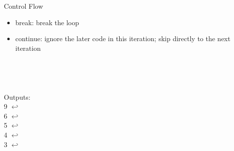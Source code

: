 \documentclass{beamer}
\begin{document}
\begin{frame}{Control Flow}
\begin{itemize}
\item break: break the loop
\item continue: ignore the later code in this iteration; skip directly to the next iteration
\end{itemize}
\begin{minipage}{0.05\textwidth}
~\\
\end{minipage}
\begin{minipage}{0.5\textwidth}

\end{minipage}
\begin{minipage}{0.05\textwidth}
~\\
\end{minipage}
\begin{minipage}{0.35\textwidth}
Outputs: \\
9 $\hookleftarrow$ \\
6 $\hookleftarrow$ \\
5 $\hookleftarrow$ \\
4 $\hookleftarrow$ \\
3 $\hookleftarrow$ \\
\end{minipage}
\end{frame}
\end{document}
